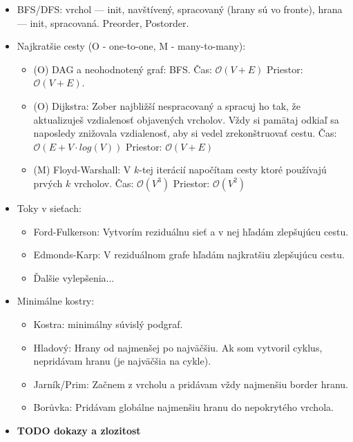 \documentclass[paper=a4, fontsize=11pt]{scrartcl} %
\numberwithin{equation}{section} %
\numberwithin{figure}{section} %
\numberwithin{table}{section} %
\begin{document}
	\begin{itemize}
		
		\item BFS/DFS: vrchol — init, navštívený, spracovaný (hrany sú vo fronte), hrana — init, spracovaná. Preorder, Postorder.
		
		\item Najkratšie cesty (O - one-to-one, M - many-to-many): 
		
		\begin{itemize}
			\item (O) DAG a neohodnotený graf: BFS. Čas: $\mathcal{O}(V + E)$ Priestor: $\mathcal{O}(V + E)$.
			
			\item (O) Dijkstra: Zober najbližší nespracovaný a spracuj ho tak, že aktualizuješ vzdialenosť objavených vrcholov. Vždy si pamätaj odkiaľ sa naposledy znižovala vzdialenosť, aby si vedel zrekonštruovať cestu. Čas: $\mathcal{O}(E + V \cdot log(V))$ Priestor: $\mathcal{O}(V + E)$
			
			\item (M) Floyd-Warshall: V $k$-tej iterácií napočítam cesty ktoré používajú prvých $k$ vrcholov. Čas: $\mathcal{O}(V^3)$ Priestor: $\mathcal{O}(V^2)$
		\end{itemize}
	
		\item Toky v sieťach:
		
		\begin{itemize}
			\item Ford-Fulkerson: Vytvorím reziduálnu sieť a v nej hľadám zlepšujúcu cestu. 
			\item Edmonds-Karp: V reziduálnom grafe hľadám najkratšiu zlepšujúcu cestu.
			\item Ďalšie vylepšenia...
		\end{itemize}
	
		\item Minimálne kostry:
		
		\begin{itemize}
			\item Kostra: minimálny súvislý podgraf.
			\item Hladový: Hrany od najmenšej po najväčšiu. Ak som vytvoril cyklus, nepridávam hranu (je najväčšia na cykle).
			\item Jarník/Prim: Začnem z vrcholu a pridávam vždy najmenšiu border hranu.
			\item Borůvka: Pridávam globálne najmenšiu hranu do nepokrytého vrchola.
		\end{itemize}
	
		\item \textbf{TODO dokazy a zlozitost}
	\end{itemize}
\end{document}
